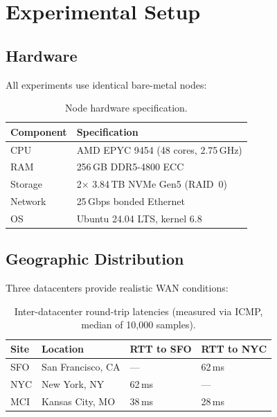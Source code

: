 \section{Experimental Setup}


\subsection{Hardware}

All experiments use identical bare-metal nodes:

\begin{table}[h]
\centering
\begin{tabular}{@{}ll@{}}
\toprule
\textbf{Component} & \textbf{Specification} \\
\midrule
CPU & AMD EPYC 9454 (48 cores, 2.75\,GHz) \\
RAM & 256\,GB DDR5-4800 ECC \\
Storage & 2$\times$ 3.84\,TB NVMe Gen5 (RAID~0) \\
Network & 25\,Gbps bonded Ethernet \\
OS & Ubuntu 24.04 LTS, kernel 6.8 \\
\bottomrule
\end{tabular}
\caption{Node hardware specification.}
\label{tab:hardware}
\end{table}

\subsection{Geographic Distribution}

Three datacenters provide realistic WAN conditions:

\begin{table}[h]
\centering
\begin{tabular}{@{}llll@{}}
\toprule
\textbf{Site} & \textbf{Location} & \textbf{RTT to SFO} & \textbf{RTT to NYC} \\
\midrule
SFO & San Francisco, CA & ---       & 62\,ms \\
NYC & New York, NY      & 62\,ms   & --- \\
MCI & Kansas City, MO   & 38\,ms   & 28\,ms \\
\bottomrule
\end{tabular}
\caption{Inter-datacenter round-trip latencies (measured via ICMP, median of 10{,}000 samples).}
\label{tab:latency}
\end{table}

